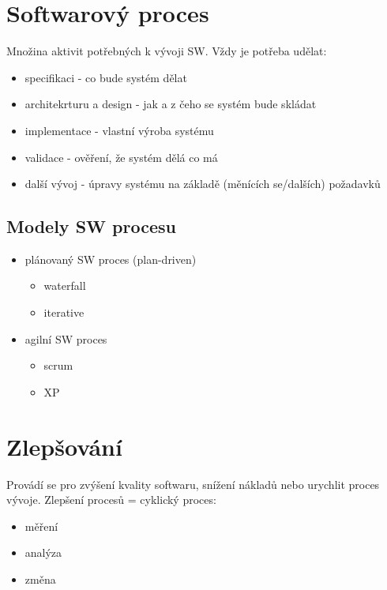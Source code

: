 \documentclass{szzclass}
\begin{document}
\tableofcontents
\newpage

\section{Softwarový proces}
Množina aktivit potřebných k vývoji SW. Vždy je potřeba udělat:
\begin{itemize}
    \item specifikaci - co bude systém dělat
    \item architekrturu a design - jak a z čeho se systém bude skládat
    \item implementace - vlastní výroba systému
    \item validace - ověření, že systém dělá co má
    \item další vývoj - úpravy systému na základě (měnících se/dalších) požadavků
\end{itemize}

\subsection{Modely SW procesu}
\begin{itemize}
    \item plánovaný SW proces (plan-driven)
    \begin{itemize}
        \item waterfall
        \item iterative
    \end{itemize}
    \item agilní SW proces
    \begin{itemize}
        \item scrum
        \item XP
    \end{itemize}
\end{itemize}
\section{Zlepšování}
Provádí se pro zvýšení kvality softwaru, snížení nákladů nebo urychlit proces vývoje.
\newline
Zlepšení procesů = cyklický proces:
\begin{itemize}
    \item měření
    \item analýza
    \item změna
\end{itemize}
\end{document}
